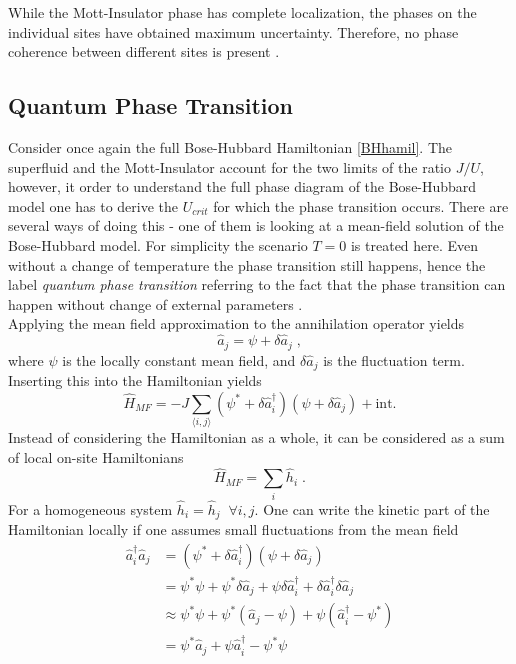 While the Mott-Insulator phase has complete localization, the phases on the individual sites have obtained maximum uncertainty. Therefore, no phase coherence between different sites is present \cite{greiner}.


\subsection{Quantum Phase Transition}
Consider once again the full Bose-Hubbard Hamiltonian \eqref{BHhamil}. The superfluid and the Mott-Insulator account for the two limits of the ratio $J/U$, however, it order to understand the full phase diagram of the Bose-Hubbard model one has to derive the $U_{crit}$ for which the phase transition occurs. There are several ways of doing this - one of them is looking at a mean-field solution of the Bose-Hubbard model. For simplicity the scenario $T=0$ is treated here. Even without a change of temperature the phase transition still happens, hence the label \textit{quantum phase transition} referring to the fact that the phase transition can happen without change of external parameters \cite{Sachdev2007QPT}.\\
Applying the mean field approximation to the annihilation operator yields
\begin{equation}
	\hat{a}_j = \psi + \delta \hat{a}_j \; ,
\end{equation}
where $\psi$ is the locally constant mean field, and $\delta \hat{a}_j$ is the fluctuation term. Inserting this into the Hamiltonian yields
\begin{equation}
	\hat{H}_{MF} = -J \sum_{\langle i,j \rangle} \left( \psi^* + \delta \hat{a}_{i}^{\dag} \right) \left( \psi + \delta \hat{a}_{j} \right) + \text{int.}
\end{equation}
Instead of considering the Hamiltonian as a whole, it can be considered as a sum of local on-site Hamiltonians
\begin{equation}
	\hat{H}_{MF} = \sum_{i} \hat{h}_i \; .
\end{equation}
For a homogeneous system $\hat{h}_i = \hat{h}_j \; \; \forall i,j$. One can write the kinetic part of the Hamiltonian locally if one assumes small fluctuations from the mean field
\begin{align}
  \hat{a}_{i}^{\dag} \hat{a}_{j} &= \left( \psi^* + \delta \hat{a}_{i}^{\dag} \right) \left( \psi + \delta \hat{a}_{j} \right) \nonumber \\
  &= \psi^* \psi + \psi^* \delta \hat{a}_j + \psi \delta \hat{a}_{i}^{\dag} + \delta \hat{a}_{i}^{\dag} \delta \hat{a}_{j} \nonumber \\
  & \approx \psi^* \psi + \psi^* \left( \hat{a}_j - \psi \right) + \psi \left( \hat{a}_{i}^{\dag} - \psi^* \right) \nonumber \\
&= \psi^* \hat{a}_j + \psi \hat{a}_{i}^{\dag} - \psi^* \psi
\end{align}
